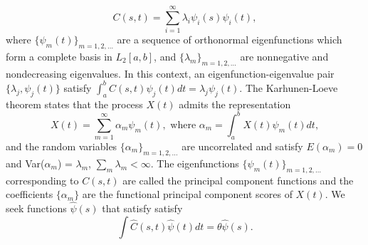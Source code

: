\begin{equation*}
	C(s,t) = \sum_{i=1}^{\infty}\lambda_i\psi_i(s)\psi_i(t), 
\end{equation*}
where $\{\psi_m(t)\}_{m=1,2,\ldots}$ are a sequence of orthonormal eigenfunctions which form a complete basis in $L_2[a,b]$, and $\{\lambda_m \}_{m=1,2,\ldots}$ are nonnegative and nondecreasing eigenvalues. In this context, an eigenfunction-eigenvalue pair $\{\lambda_j, \psi_j(t)\}$ satisfy $\int_a^bC(s,t)\psi_j(t)dt = \lambda_j\psi_j(t)$. The Karhunen-Loeve theorem states that the process $X(t)$ admits the representation 
\begin{equation*}
	X(t) = \sum_{m=1}^{\infty}\alpha_m \psi_m(t), \mbox{ where } \alpha_m = \int_a^b X(t) \psi_m(t)dt, 
\end{equation*}
and the random variables $\{\alpha_m \}_{m=1,2,\ldots}$ are uncorrelated and satisfy $E(\alpha_m)=0$ and Var($\alpha_m$) = $\lambda_m$, $\sum_m \lambda_m < \infty$. The eigenfunctions $\{\psi_m(t)\}_{m=1,2,\ldots}$ corresponding to $C(s,t)$ are called the principal component functions and the coefficients $\{\alpha_m \}$ are the functional principal component scores of $X(t)$. We seek functions $\hat{\psi}(s)$ that satisfy satisfy 
\begin{equation}
	\label{eq:eigenfuns} \int \hat{C}(s,t)\hat{\psi}(t)dt=\theta\hat{\psi}(s). 
\end{equation}

